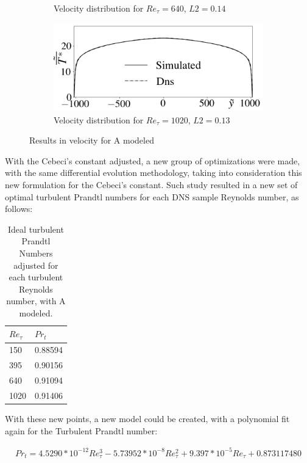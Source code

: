 \documentclass[10pt]{article} %
\begin{document}
\begin{figure}[!h]
\begin{subfigure}[t]{0.5\textwidth}
		\caption{Velocity distribution for $Re_\tau = 640$, $L2 = 0.14$}
	\end{subfigure}
	\begin{subfigure}[t]{0.45\textwidth}
		\centering
		\includegraphics[angle=0, scale=0.24]{fotos_formatacao_final/Temperature_1000_Amodeled}
		\caption{Velocity distribution for $Re_\tau = 1020$, $L2 = 0.13$}
	\end{subfigure}	
	\caption{Results in velocity for A modeled}
\end{figure}

With the Cebeci's constant adjusted, a new group of optimizations were made, with the same differential evolution methodology, taking into consideration this new formulation for the Cebeci's constant. Such study resulted in a new set of optimal turbulent Prandtl numbers for each DNS sample Reynolds number, as follows:


\begin{table}[!h]
	\centering
	\caption{Ideal turbulent Prandtl Numbers adjusted for each turbulent Reynolds number, with A modeled. }
	\begin{tabular}{ll}
		\hline
		$Re_\tau$ & $Pr_t$\\
		\hline
		150  &   0.88594\\
		395  &   0.90156\\
		640  &   0.91094\\
		1020 &   0.91406\\ 
		\hline
	\end{tabular}
\end{table}

With these new points, a new model could be created, with a polynomial fit again for the Turbulent Prandtl number:

\begin{equation}
\begin{split}
Pr_t = 4.5290 * 10^{-12} Re_\tau^3 - 5.73952 * 10^{-8} Re_\tau^2 + 9.397 * 10^{-5} Re_\tau + 0.873117480 
\end{split}
\end{equation}
\end{document}
